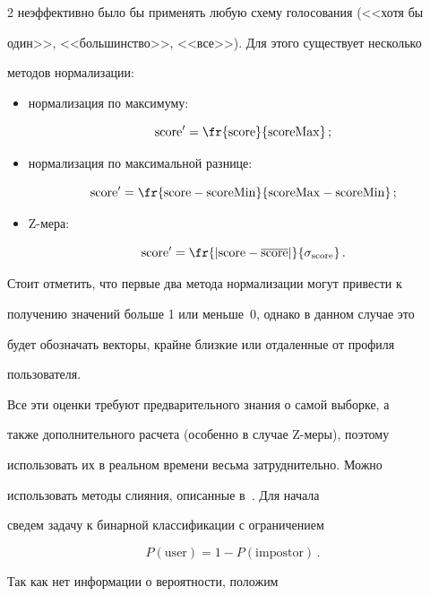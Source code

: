 \begin{multicols}{2}
неэффективно было бы применять любую схему голосования (<<хотя бы

один>>, <<большинство>>, <<все>>). Для этого существует несколько

методов нормализации:

\begin{itemize}

    \item нормализация по максимуму: 

    $$\mathrm{score}'=\fr{\mathrm{score}}{\mathrm{scoreMax}}\,;

    $$

    \item нормализация по максимальной разнице: 

    $$

    \mathrm{score}' = \fr{\mathrm{score - scoreMin}}{\mathrm{scoreMax - scoreMin}}\,;

    $$

    \item Z-мера: 

    $$

    \mathrm{score}'=\fr{|\mathrm{score} - \overline{\mathrm{score}}|}{\sigma_{\mathrm{score}}}\,.

    $$

\end{itemize}



Стоит отметить, что первые два метода нормализации могут привести к

получению значений больше 1 или меньше~0, однако в данном случае это

будет обозначать векторы, крайне близкие или отдаленные от профиля

пользователя.



Все эти оценки требуют предварительного знания о самой выборке, а

также дополнительного расчета (особенно в случае Z-ме\-ры), поэтому

использовать их в реальном времени весьма затруднительно. Можно

использовать методы слияния, описанные в~\cite{kittler}. Для начала

сведем задачу к бинарной классификации с ограничением 

$$

P(\mathrm{user}) = 1 - P(\mathrm{impostor})\,.

$$

Так как нет информации о вероятности, положим


\end{multicols}
